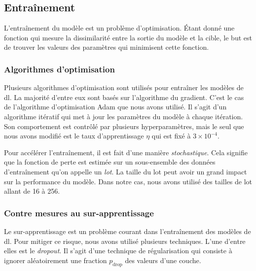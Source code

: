 \subsection{Entraînement}

L'entraînement du modèle est un problème d'optimisation.
Étant donné une fonction qui mesure la dissimilarité entre la sortie du modèle et la cible,
le but est de trouver les valeurs des paramètres qui minimisent cette fonction.

\subsubsection{Algorithmes d'optimisation}

Plusieurs algorithmes d'optimisation sont utilisés pour entraîner les modèles de \gls{dl}.
La majorité d'entre eux sont basés sur l'algorithme du gradient.
C'est le cas de l'algorithme d'optimisation Adam \cite{Kingma_Ba_2017} que nous avons utilisé.
Il s'agit d'un algorithme itératif qui met à jour les paramètres du modèle à chaque itération.
Son comportement est contrôlé par plusieurs hyperparamètres,
mais le seul que nous avons modifié est le taux d'apprentissage \(\eta\) qui est fixé à \(3\times10^{-4}\).

Pour accélérer l'entraînement, il est fait d'une manière \emph{stochastique}.
Cela signifie que la fonction de perte est estimée 
sur un sous-ensemble des données d'entraînement qu'on appelle un \emph{lot}.
La taille du lot peut avoir un grand impact sur la performance du modèle.
Dans notre cas, nous avons utilisé des tailles de lot allant de 16 à 256.


\subsubsection{Contre mesures au sur-apprentissage}

Le sur-apprentissage est un problème courant dans l'entraînement des modèles de \gls{dl}.
Pour mitiger ce risque, nous avons utilisé plusieurs techniques.
L'une d'entre elles est le \emph{\foreignlanguage{english}{dropout}}.
Il s'agit d'une technique de régularisation 
qui consiste à ignorer aléatoirement une fraction \(p_{\mathrm{drop}}\) des valeurs d'une couche.

